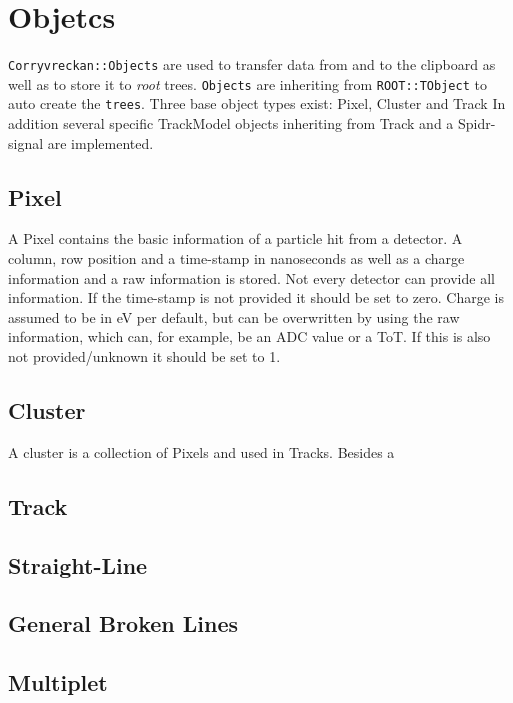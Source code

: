 \section{Objetcs}
\label{sec:objects}
\texttt{Corryvreckan::Objects} are used to transfer data from and to the clipboard as well as to store it to \textit{root} trees. 
\texttt{Objects} are inheriting from \texttt{ROOT::TObject} to auto create the \texttt{trees}. 
Three base object types exist: Pixel, Cluster and Track
In addition several specific TrackModel objects inheriting from Track and a Spidr-signal are implemented. 

\subsection*{Pixel}
A Pixel contains the basic information of a particle hit from a detector. A column, row position and a time-stamp in nanoseconds as well as a charge information and a raw information is stored. Not every detector can provide all information. If the time-stamp is not provided it should be set to zero. Charge is assumed to be in eV per default, but can be overwritten by using the raw information, which can, for example, be an ADC value or a ToT. If this is also not provided/unknown it should be set to 1. 

\subsection*{Cluster}
A cluster is a collection of Pixels and used in Tracks. Besides a 
\subsection{Track}
\subsection*{Straight-Line}
\subsection*{General Broken Lines}
\subsection*{Multiplet}

